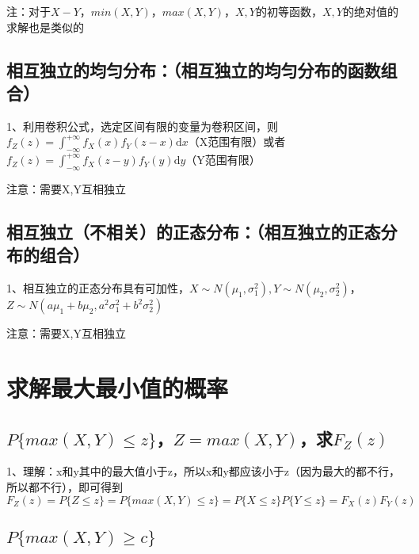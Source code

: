 注：对于$X-Y$，$min(X,Y)$，$max(X,Y)$，$X,Y$的初等函数，$X,Y$的绝对值的求解也是类似的



\subsection{相互独立的均匀分布：（相互独立的均匀分布的函数组合）}

1、利用卷积公式，选定区间有限的变量为卷积区间，则$f_{Z}(z)=\int_{-\infty}^{+\infty} f_{X}(x) f_{Y}(z-x) \mathrm{d} x$（X范围有限）或者$f_{Z}(z)=\int_{-\infty}^{+\infty} f_{X}(z-y) f_{Y}(y) \mathrm{d} y$（Y范围有限）

注意：需要X,Y互相独立



\subsection{相互独立（不相关）的正态分布：（相互独立的正态分布的组合）}

1、相互独立的正态分布具有可加性，$X \sim{N}\left(\mu_{1}, \sigma_{1}^{2}\right), Y \sim N\left(\mu_{2}, \sigma_{2}^{2}\right)$，$Z \sim N\left(a\mu_{1}+b\mu_{2}, a^2\sigma_{1}^{2}+b^2\sigma_{2}^{2}\right)$

注意：需要X,Y互相独立

\section{求解最大最小值的概率}



\subsection{$P\{max(X,Y)\le z\}$，$Z=max(X,Y)$，求$F_Z(z)$}

1、理解：x和y其中的最大值小于z，所以x和y都应该小于z（因为最大的都不行，所以都不行），即可得到$F_{Z}(z)=P\{Z\le z\}=P\{max(X,Y)\le z\}=P\{X \le z\}P\{Y \le z\}=F_X(z)F_Y(z)$



\subsection{$P\{max(X,Y)\ge c\}$}

